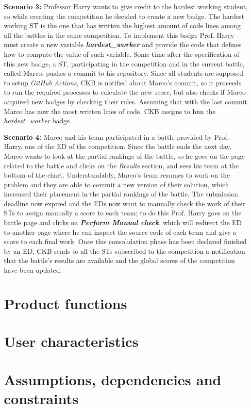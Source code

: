 \textbf{Scenario 3:} Professor Harry wants to give credit to the hardest working student, so while creating the competition he decided to create a new badge. The hardest working ST is the one that has written the highest amount of code lines among all the battles in the same competition. To implement this badge Prof. Harry must create a new variable \textbf{\textit{hardest\_worker}} and provide the code that defines how to compute the value of such variable. Some time after the specification of this new badge, a ST, participating in the competition and in the current battle, called Marco, pushes a commit to his repository. Since all students are supposed to setup \textit{GitHub Actions}, CKB is notified about Marco's commit, so it proceeds to run the required processes to calculate the new score, but also checks if Marco acquired new badges by checking their rules. Assuming that with the last commit Marco has now the most written lines of code, CKB assigns to him the \textit{hardest\_worker} badge.


\textbf{Scenario 4:} Marco and his team participated in a battle provided by Prof. Harry, one of the ED of the competition. Since the battle ends the next day, Marco wants to look at the partial rankings of the battle, so he goes on the page related to the battle and clicks on the \textit{Results} section, and sees his team at the bottom of the chart. Understandably, Marco's team resumes to work on the problem and they are able to commit a new version of their solution, which increased their placement in the partial rankings of the battle. The submission deadline now expired and the EDs now want to manually check the work of their STs to assign manually a score to each team; to do this Prof. Harry goes on the battle page and clicks on \textbf{\textit{Perform Manual check}}, which will redirect the ED to another page where he can inspect the source code of each team and give a score to each final work. Once this consolidation phase has been declared finished by an ED, CKB sends to all the STs subscribed to the competition a notification that the battle's results are available and the global scores of the competition have been updated.


\section{Product functions}
\label{s:Product_functions}%

\section{User characteristics}
\label{s:User_characteristics}%


\section{Assumptions, dependencies and constraints}
\label{s:Assumptions_dependencies_and_constraints}%


